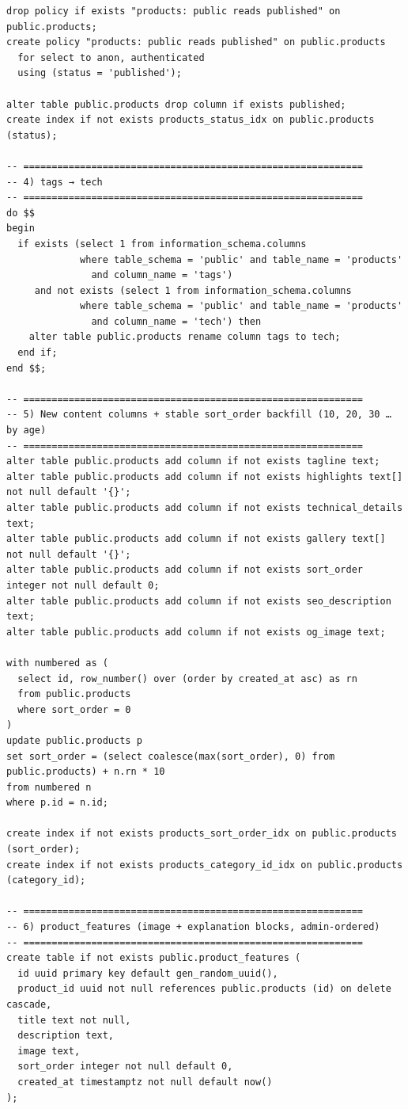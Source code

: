 \documentclass[11pt,a4paper]{article}
\begin{document}
\begin{lstlisting}
drop policy if exists "products: public reads published" on public.products;
create policy "products: public reads published" on public.products
  for select to anon, authenticated
  using (status = 'published');

alter table public.products drop column if exists published;
create index if not exists products_status_idx on public.products (status);

-- ============================================================
-- 4) tags → tech
-- ============================================================
do $$
begin
  if exists (select 1 from information_schema.columns
             where table_schema = 'public' and table_name = 'products'
               and column_name = 'tags')
     and not exists (select 1 from information_schema.columns
             where table_schema = 'public' and table_name = 'products'
               and column_name = 'tech') then
    alter table public.products rename column tags to tech;
  end if;
end $$;

-- ============================================================
-- 5) New content columns + stable sort_order backfill (10, 20, 30 … by age)
-- ============================================================
alter table public.products add column if not exists tagline text;
alter table public.products add column if not exists highlights text[] not null default '{}';
alter table public.products add column if not exists technical_details text;
alter table public.products add column if not exists gallery text[] not null default '{}';
alter table public.products add column if not exists sort_order integer not null default 0;
alter table public.products add column if not exists seo_description text;
alter table public.products add column if not exists og_image text;

with numbered as (
  select id, row_number() over (order by created_at asc) as rn
  from public.products
  where sort_order = 0
)
update public.products p
set sort_order = (select coalesce(max(sort_order), 0) from public.products) + n.rn * 10
from numbered n
where p.id = n.id;

create index if not exists products_sort_order_idx on public.products (sort_order);
create index if not exists products_category_id_idx on public.products (category_id);

-- ============================================================
-- 6) product_features (image + explanation blocks, admin-ordered)
-- ============================================================
create table if not exists public.product_features (
  id uuid primary key default gen_random_uuid(),
  product_id uuid not null references public.products (id) on delete cascade,
  title text not null,
  description text,
  image text,
  sort_order integer not null default 0,
  created_at timestamptz not null default now()
);


\end{lstlisting}
\end{document}
